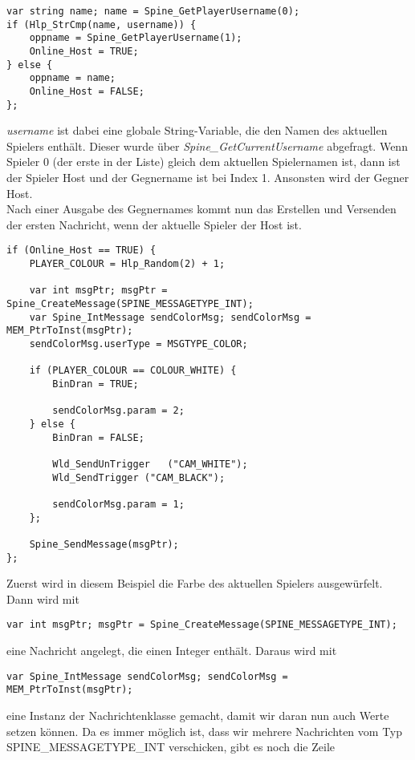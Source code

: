 \documentclass{article}
\begin{document}
\begin{lstlisting}
var string name; name = Spine_GetPlayerUsername(0);
if (Hlp_StrCmp(name, username)) {
	oppname = Spine_GetPlayerUsername(1);
	Online_Host = TRUE;
} else {
	oppname = name;
	Online_Host = FALSE;
};
\end{lstlisting}

\textit{username} ist dabei eine globale String-Variable, die den Namen des aktuellen Spielers enthält. Dieser wurde über \textit{Spine\_GetCurrentUsername} abgefragt. Wenn Spieler 0 (der erste in der Liste) gleich dem aktuellen Spielernamen ist, dann ist der Spieler Host und der Gegnername ist bei Index 1. Ansonsten wird der Gegner Host.\\

Nach einer Ausgabe des Gegnernames kommt nun das Erstellen und Versenden der ersten Nachricht, wenn der aktuelle Spieler der Host ist.

\begin{lstlisting}
if (Online_Host == TRUE) {
	PLAYER_COLOUR = Hlp_Random(2) + 1;

	var int msgPtr; msgPtr = Spine_CreateMessage(SPINE_MESSAGETYPE_INT);
	var Spine_IntMessage sendColorMsg; sendColorMsg = MEM_PtrToInst(msgPtr);
	sendColorMsg.userType = MSGTYPE_COLOR;
				
	if (PLAYER_COLOUR == COLOUR_WHITE) {
		BinDran = TRUE;

		sendColorMsg.param = 2;
	} else {
		BinDran = FALSE;

		Wld_SendUnTrigger	("CAM_WHITE");
		Wld_SendTrigger	("CAM_BLACK");

		sendColorMsg.param = 1;
	};
				
	Spine_SendMessage(msgPtr);
};
\end{lstlisting}

Zuerst wird in diesem Beispiel die Farbe des aktuellen Spielers ausgewürfelt. Dann wird mit

\begin{lstlisting}
var int msgPtr; msgPtr = Spine_CreateMessage(SPINE_MESSAGETYPE_INT);
\end{lstlisting}

eine Nachricht angelegt, die einen Integer enthält. Daraus wird mit

\begin{lstlisting}
var Spine_IntMessage sendColorMsg; sendColorMsg = MEM_PtrToInst(msgPtr);
\end{lstlisting}

eine Instanz der Nachrichtenklasse gemacht, damit wir daran nun auch Werte setzen können. Da es immer möglich ist, dass wir mehrere Nachrichten vom Typ SPINE\_MESSAGETYPE\_INT verschicken, gibt es noch die Zeile
\end{document}
